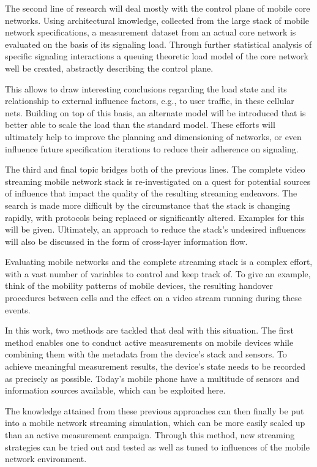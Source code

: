 The second line of research will deal mostly with the control plane of mobile core networks. Using architectural knowledge, collected from the large stack of mobile network specifications, a measurement dataset from an actual core network is evaluated on the basis of its signaling load. Through further statistical analysis of specific signaling interactions a queuing theoretic load model of the core network well be created, abstractly describing the control plane. 

This allows to draw interesting conclusions regarding the load state and its relationship to external influence factors, e.g., to user traffic, in these cellular nets. Building on top of this basis, an alternate model will be introduced that is better able to scale the load than the standard model. These efforts will ultimately help to improve the planning and dimensioning of networks, or even influence future specification iterations to reduce their adherence on signaling.


The third and final topic bridges both of the previous lines. The complete video streaming mobile network stack is re-investigated on a quest for potential sources of influence that impact the quality of the resulting streaming endeavors. The search is made more difficult by the circumstance that the stack is changing rapidly, with protocols being replaced or significantly altered. Examples for this will be given. Ultimately, an approach to reduce the stack's undesired influences will also be discussed in the form of cross-layer information flow.

Evaluating mobile networks and the complete streaming stack is a complex effort, with a vast number of variables to control and keep track of. To give an example, think of the mobility patterns of mobile devices, the resulting handover procedures between cells and the effect on a video stream running during these events. 

In this work, two methods are tackled that deal with this situation. The first method enables one to conduct active measurements on mobile devices while combining them with the metadata from the device's stack and sensors. To achieve meaningful measurement results, the device's state needs to be recorded as precisely as possible. Today's mobile phone have a multitude of sensors and information sources available, which can be exploited here.

The knowledge attained from these previous approaches can then finally be put into a mobile network streaming simulation, which can be more easily scaled up than an active measurement campaign. Through this method, new streaming strategies can be tried out and tested as well as tuned to influences of the mobile network environment.


